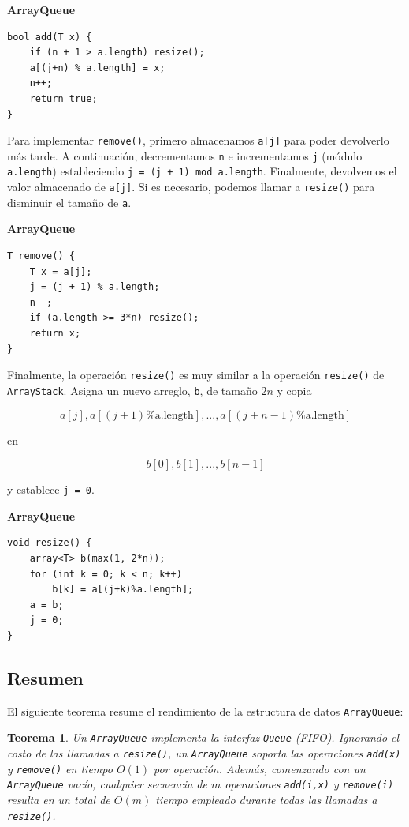 \documentclass[11pt]{book}
\theoremstyle{plain}
\newtheorem{teorema}{Teorema}[chapter]
\newcommand{\claseheader}[1]{\noindent\textbf{#1}\par\vspace{-4pt}}
\begin{document}
\claseheader{ArrayQueue}
\begin{lstlisting}
bool add(T x) {
    if (n + 1 > a.length) resize();
    a[(j+n) % a.length] = x;
    n++;
    return true;
}
\end{lstlisting}

Para implementar \texttt{remove()}, primero almacenamos \texttt{a[j]} para poder devolverlo más tarde. A continuación, decrementamos \texttt{n} e incrementamos \texttt{j} (módulo \texttt{a.length}) estableciendo \texttt{j = (j + 1) mod a.length}. Finalmente, devolvemos el valor almacenado de \texttt{a[j]}. Si es necesario, podemos llamar a \texttt{resize()} para disminuir el tamaño de \texttt{a}.

\claseheader{ArrayQueue}
\begin{lstlisting}
T remove() {
    T x = a[j];
    j = (j + 1) % a.length;
    n--;
    if (a.length >= 3*n) resize();
    return x;
}
\end{lstlisting}

Finalmente, la operación \texttt{resize()} es muy similar a la operación \texttt{resize()} de \texttt{ArrayStack}. Asigna un nuevo arreglo, \texttt{b}, de tamaño $2n$ y copia

$$
a[j], a[(j + 1)\%\text{a.length}], ..., a[(j + n - 1)\%\text{a.length}]
$$

en

$$
b[0], b[1], ..., b[n - 1]
$$

y establece \texttt{j = 0}.

\claseheader{ArrayQueue}
\begin{lstlisting}
void resize() {
    array<T> b(max(1, 2*n));
    for (int k = 0; k < n; k++)
        b[k] = a[(j+k)%a.length];
    a = b;
    j = 0;
}
\end{lstlisting}

\subsection{Resumen}

El siguiente teorema resume el rendimiento de la estructura de datos \texttt{ArrayQueue}:

\begin{teorema}
Un \texttt{ArrayQueue} implementa la interfaz \texttt{Queue} (FIFO). Ignorando el costo de las llamadas a \texttt{resize()}, un \texttt{ArrayQueue} soporta las operaciones \texttt{add(x)} y \texttt{remove()} en tiempo $O(1)$ por operación. Además, comenzando con un \texttt{ArrayQueue} vacío, cualquier secuencia de $m$ operaciones \texttt{add(i,x)} y \texttt{remove(i)} resulta en un total de $O(m)$ tiempo empleado durante todas las llamadas a \texttt{resize()}.
\end{teorema}
\end{document}
